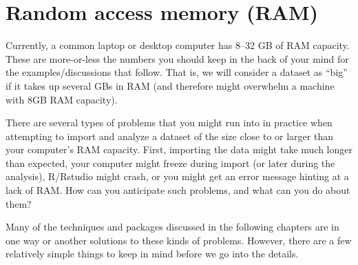 \documentclass[
  12pt,
]{style/krantz}
\begin{document}
\hypertarget{random-access-memory-ram}{%
\section{Random access memory (RAM)}\label{random-access-memory-ram}}

Currently, a common laptop or desktop computer has 8--32 GB of RAM capacity. These are more-or-less the numbers you should keep in the back of your mind for the examples/discussions that follow. That is, we will consider a dataset as ``big'' if it takes up several GBs in RAM (and therefore might overwhelm a machine with 8GB RAM capacity).

There are several types of problems that you might run into in practice when attempting to import and analyze a dataset of the size close to or larger than your computer's RAM capacity. First, importing the data might take much longer than expected, your computer might freeze during import (or later during the analysis), R/Rstudio might crash, or you might get an error message hinting at a lack of RAM. How can you anticipate such problems, and what can you do about them?

Many of the techniques and packages discussed in the following chapters are in one way or another solutions to these kinds of problems. However, there are a few relatively simple things to keep in mind before we go into the details.
\end{document}
